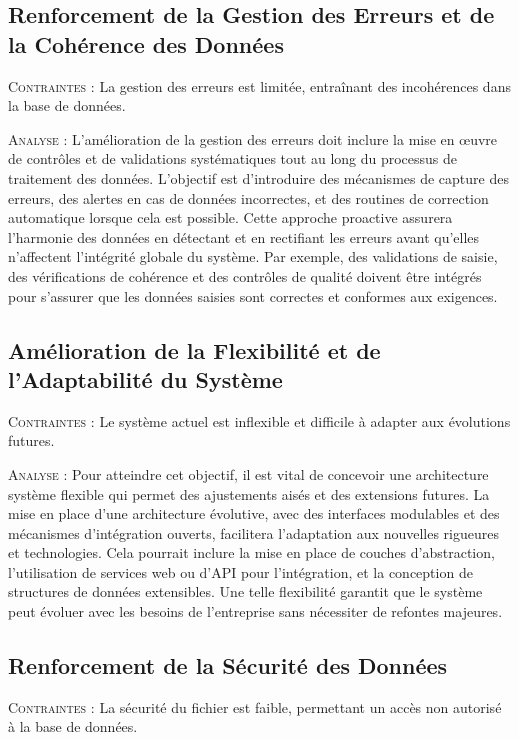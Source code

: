 \documentclass[a4paper, oneside, 12pt, final]{extreport}
\begin{document}
\subsection{Renforcement de la Gestion des Erreurs et de la Cohérence des Données}
\textsc{Contraintes} : La gestion des erreurs est limitée, entraînant des incohérences dans la base de données.

\textsc{Analyse} : L’amélioration de la gestion des erreurs doit inclure la mise en œuvre de contrôles et de validations systématiques tout au long du processus de traitement des données. L’objectif est d’introduire des mécanismes de capture des erreurs, des alertes en cas de données incorrectes, et des routines de correction automatique lorsque cela est possible. Cette approche proactive assurera l’harmonie des données en détectant et en rectifiant les erreurs avant qu’elles n’affectent l’intégrité globale du système. Par exemple, des validations de saisie, des vérifications de cohérence et des contrôles de qualité doivent être intégrés pour s’assurer que les données saisies sont correctes et conformes aux exigences.

\subsection{Amélioration de la Flexibilité et de l’Adaptabilité du Système}
\textsc{Contraintes} : Le système actuel est inflexible et difficile à adapter aux évolutions futures.

\textsc{Analyse} : Pour atteindre cet objectif, il est vital de concevoir une architecture système flexible qui permet des ajustements aisés et des extensions futures. La mise en place d’une architecture évolutive, avec des interfaces modulables et des mécanismes d'intégration ouverts, facilitera l’adaptation aux nouvelles rigueures et technologies. Cela pourrait inclure la mise en place de couches d’abstraction, l’utilisation de services web ou d’API pour l’intégration, et la conception de structures de données extensibles. Une telle flexibilité garantit que le système peut évoluer avec les besoins de l’entreprise sans nécessiter de refontes majeures.

\subsection{Renforcement de la Sécurité des Données}
\textsc{Contraintes} : La sécurité du fichier est faible, permettant un accès non autorisé à la base de données.
\end{document}
